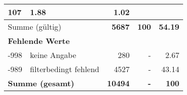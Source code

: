 \begin{longtable}{lXrrr}
       \num{107} &
       \num[round-mode=places,round-precision=2]{1.88} &
         \num[round-mode=places,round-precision=2]{1.02} \\
     \midrule
     \multicolumn{2}{l}{Summe (gültig)} &
       \textbf{\num{5687}} &
     \textbf{\num{100}} &
       \textbf{\num[round-mode=places,round-precision=2]{54.19}} \\
     \multicolumn{5}{l}{\textbf{Fehlende Werte}}\\
       -998 &
       keine Angabe &
         \num{280} &
        - &
         \num[round-mode=places,round-precision=2]{2.67} \\
       -989 &
       filterbedingt fehlend &
         \num{4527} &
        - &
         \num[round-mode=places,round-precision=2]{43.14} \\
     \midrule
     \multicolumn{2}{l}{\textbf{Summe (gesamt)}} &
          \textbf{\num{10494}} &
        \textbf{-} &
        \textbf{\num{100}} \\
     \bottomrule
     \end{longtable}
     
